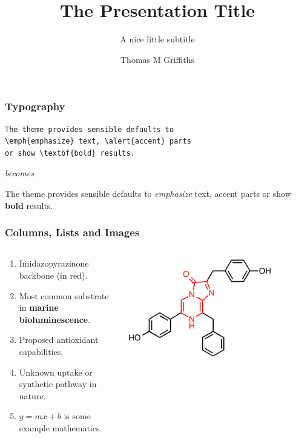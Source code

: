 \documentclass[aspectratio=1610]{beamer}
\title{The Presentation Title}
\subtitle{A nice little subtitle}
\author[Thomas]{Thomas M Griffiths}
\institute{School of Chemistry}
\date{}
\begin{document}
\maketitle

\begin{frame}[fragile]
\frametitle{Typography}
\begin{verbatim}
The theme provides sensible defaults to 
\emph{emphasize} text, \alert{accent} parts 
or show \textbf{bold} results.
\end{verbatim}
\begin{center} \textit{becomes} \end{center}
The theme provides sensible defaults to \emph{emphasize} text, \alert{accent} parts or show \textbf{bold} results.
\end{frame}

\begin{frame}
   \frametitle{Columns, Lists and Images}
   \begin{columns}[T]
      \begin{column}{0.5\textwidth}
         \begin{enumerate}
            \item Imidazopyrazinone backbone (in red).
            \item Most common substrate in \textbf{marine bioluminescence}.
            \item Proposed antioxidant capabilities.
            \item Unknown uptake or synthetic pathway in nature.
            \item $y=mx+b$ is some example mathematics.
         \end{enumerate}
      \end{column}
      \begin{column}{0.5\textwidth}
         \centering
         \includegraphics[width=0.8\textwidth]{coelenterazine.png}
      \end{column}
   \end{columns}
\end{frame}
\end{document}
